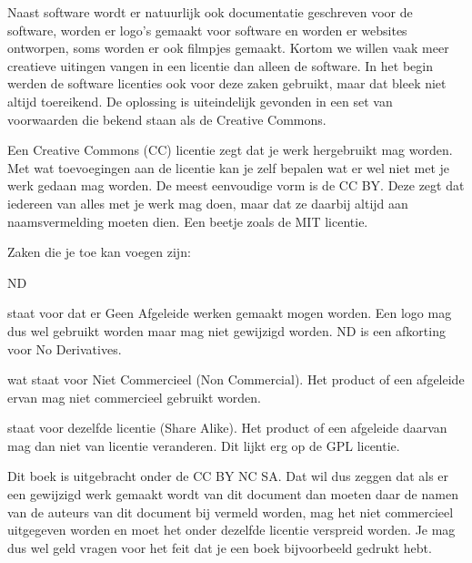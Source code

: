 Naast software wordt er natuurlijk ook documentatie geschreven voor de software, worden er logo's gemaakt voor software en worden er websites
ontworpen, soms worden er ook filmpjes gemaakt. Kortom we willen vaak meer creatieve uitingen vangen in een
licentie dan alleen de software. In het begin werden de software licenties ook voor deze zaken gebruikt, maar dat bleek
niet altijd toereikend. De oplossing is uiteindelijk gevonden in een set van voorwaarden die bekend staan als de
Creative Commons.\par

Een Creative Commons (CC) licentie zegt dat je werk hergebruikt mag worden. Met wat toevoegingen aan de licentie kan je zelf bepalen wat er wel niet met je werk
gedaan mag worden. De meest eenvoudige vorm is de CC BY. Deze zegt dat iedereen van alles met je werk mag doen, maar
dat ze daarbij altijd aan naamsvermelding moeten dien. Een beetje zoals de MIT licentie.\par

Zaken die je toe kan voegen zijn:

\begin{labeling}{ND}
\item [ND] staat voor dat er Geen Afgeleide werken gemaakt mogen worden. Een logo mag dus wel gebruikt worden maar mag niet gewijzigd worden. ND is een afkorting voor No Derivatives.
\item [NC] wat staat voor Niet Commercieel (Non Commercial). Het product of een afgeleide ervan mag niet commercieel gebruikt worden.
\item [SA] staat voor dezelfde licentie (Share Alike). Het product of een afgeleide daarvan mag dan niet van licentie veranderen. Dit lijkt erg op de GPL licentie.
\end{labeling}

Dit boek is uitgebracht onder de CC BY NC SA. Dat wil dus zeggen dat als er een gewijzigd werk gemaakt wordt van dit
document dan moeten daar de namen van de auteurs van dit document bij vermeld worden, mag het niet commercieel
uitgegeven worden en moet het onder dezelfde licentie verspreid worden. Je mag dus wel geld vragen voor het feit dat je een
boek bijvoorbeeld gedrukt hebt.

